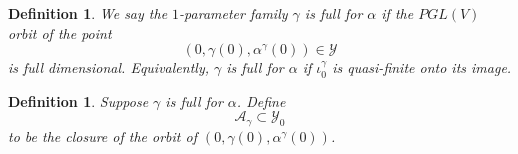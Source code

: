 \documentclass[12 pt, reqno]{amsart}
\newtheorem{lem}[thm]{Lemma}
\newtheorem{defn}[thm]{Definition}
\theoremstyle{definition}
\newcommand{\on}{\operatorname}
\newcommand{\mb}{\mathbb}
\renewcommand{\P}{\mb{P}}
\begin{document}
\begin{defn}
  \label{def:fullgamma}
  We say the $1$-parameter family $\gamma$ is {\sl full for $\alpha$}
  if the $PGL(V)$ orbit of the point
  \[(0, \gamma(0), \alpha^{\gamma}(0)) \in \mathcal{Y}\] is full
  dimensional. Equivalently, $\gamma$ is full for $\alpha$ if
  $\iota^{\gamma}_{0}$ is quasi-finite onto its image.
\end{defn}

\begin{defn}
  \label{def:Agamma}
  Suppose $\gamma$ is full for $\alpha$. Define
  \[\mathcal{A}_{\gamma} \subset \mathcal{Y}_{0} \] to be the closure
  of the orbit of $(0, \gamma(0), \alpha^{\gamma}(0))$.  
\end{defn}

\end{document}
